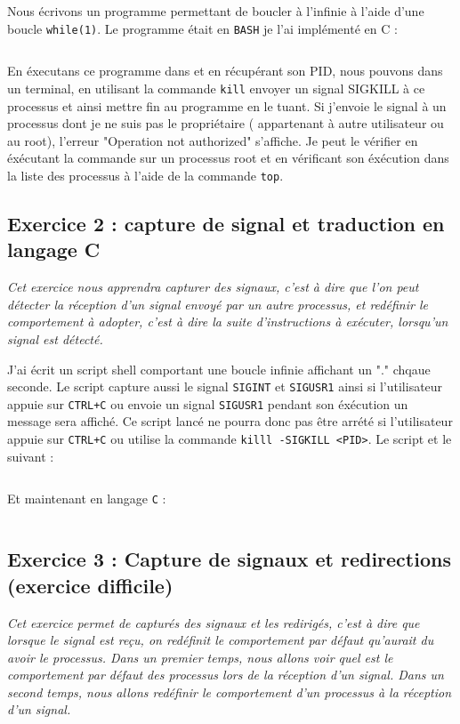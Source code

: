 Nous écrivons un programme permettant de boucler à l'infinie à l'aide d'une boucle \texttt{while(1)}. Le programme était en \texttt{BASH} je l'ai implémenté en C :
\inputminted[linenos]{cpp}{../sources/cpp/TP5-6/ex1.c}

En éxecutans ce programme dans et en récupérant son PID, nous pouvons dans un terminal, en utilisant la commande \texttt{kill} envoyer un signal SIGKILL à ce processus et ainsi mettre fin au programme en le tuant. Si j'envoie le signal à un processus dont je ne suis pas le propriétaire ( appartenant à autre utilisateur ou au root), l'erreur "Operation not authorized" s'affiche. Je peut le vérifier en éxécutant la commande sur un processus root et en vérificant son éxécution dans la liste des processus à l'aide de la commande \texttt{top}.

\subsection{Exercice 2 : capture de signal et traduction en langage C}
\textit{Cet exercice nous apprendra capturer des signaux, c’est à dire que l’on peut détecter la réception d’un signal envoyé par un autre processus, et redéfinir le comportement à adopter, c’est à dire la suite d’instructions à exécuter, lorsqu’un signal est détecté.}

J'ai écrit un script shell comportant une boucle infinie affichant un "." chqaue seconde. Le script capture aussi le signal \texttt{SIGINT} et \texttt{SIGUSR1} ainsi si l'utilisateur appuie sur \texttt{CTRL+C} ou envoie un signal \texttt{SIGUSR1} pendant son éxécution un message sera affiché. Ce script lancé ne pourra donc pas être arrété si l'utilisateur appuie sur \texttt{CTRL+C} ou utilise la commande \texttt{killl -SIGKILL <PID>}.
Le script et le suivant :
\inputminted{bash}{../sources/cpp/TP5-6/ex2-boucle.sh}
Et maintenant en langage \texttt{C} :
\inputminted[linenos,firstline=5, lastline=27]{cpp}{../sources/cpp/TP5-6/ex2.c}

\subsection{Exercice 3 : Capture de signaux et redirections (exercice difficile)}
\textit{Cet exercice permet de capturés des signaux et les redirigés, c’est à dire que lorsque le signal est reçu, on redéfinit le comportement par défaut qu’aurait du avoir le processus. Dans un premier temps, nous allons voir quel est le comportement par défaut des processus lors de la réception d’un signal. Dans un  second temps, nous allons redéfinir le comportement d’un processus à la réception d’un signal.}

